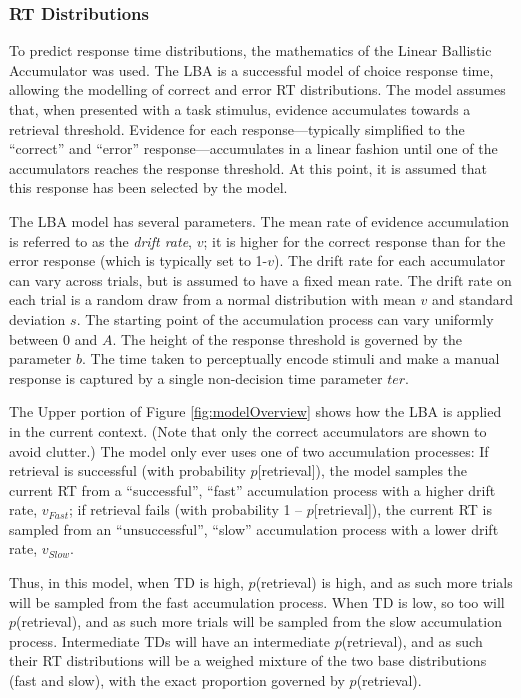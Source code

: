 \documentclass[a4paper, man, natbib]{apa6}
\begin{document}
\subsubsection{RT Distributions}
To predict response time distributions, the mathematics of the Linear Ballistic Accumulator \citep{Brown2008} was used. The LBA is a successful model of choice response time, allowing the modelling of correct and error RT distributions. The model assumes that, when presented with a task stimulus, evidence accumulates towards a retrieval threshold. Evidence for each response---typically simplified to the ``correct'' and ``error'' response---accumulates in a linear fashion until one of the accumulators reaches the response threshold. At this point, it is assumed that this response has been selected by the model. 

The LBA model has several parameters. The mean rate of evidence accumulation is referred to as the \emph{drift rate}, $v$; it is higher for the correct response than for the error response (which is typically set to 1-$v$). The drift rate for each accumulator can vary across trials, but is assumed to have a fixed mean rate. The drift rate on each trial is a random draw from a normal distribution with mean $v$ and standard deviation $s$. The starting point of the accumulation process can vary uniformly between 0 and $A$. The height of the response threshold is governed by the parameter $b$. The time taken to perceptually encode stimuli and make a manual response is captured by a single non-decision time parameter $ter$. 

The Upper portion of Figure \ref{fig:modelOverview} shows how the LBA is applied in the current context. (Note that only the correct accumulators are shown to avoid clutter.) The model only ever uses one of two accumulation processes: If retrieval is successful (with probability $p$[retrieval]), the model samples the current RT from a ``successful'', ``fast'' accumulation process with a higher drift rate, $v_{Fast}$; if retrieval fails (with probability 1 -- $p$[retrieval]), the current RT is sampled from an ``unsuccessful'', ``slow'' accumulation process with a lower drift rate, $v_{Slow}$. 

Thus, in this model, when TD is high, $p$(retrieval) is high, and as such more trials will be sampled from the fast accumulation process. When TD is low, so too will  $p$(retrieval), and as such more trials will be sampled from the slow accumulation process. Intermediate TDs will have an intermediate $p$(retrieval), and as such their RT distributions will be a weighed mixture of the two base distributions (fast and slow), with the exact proportion governed by $p$(retrieval). 
\end{document}
